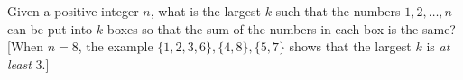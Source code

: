 Given a positive integer $n$, what is the largest $k$ such that the numbers $1,2,\ldots,n$ can be put into $k$ boxes so that the sum of the numbers in each box is the same? [When $n=8$, the example $\{1,2,3,6\},\{4,8\},\{5,7\}$ shows that the largest $k$ is \emph{at least} $3$.]